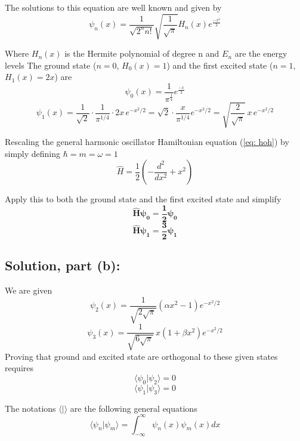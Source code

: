 \documentclass[12pt]{article}
\begin{document}
        The solutions to this equation are well known and given by
        \[
            \psi_n(x) = \frac{1}{\sqrt{2^n n!}} \sqrt{\frac{1}{\sqrt{\pi}}} H_n(x) e^{\frac{-x^2}{2}} 
        \]

        Where $H_n(x)$ is the Hermite polynomial of degree n and $E_n$ are the energy levels
        The ground state ($n=0$, $H_0(x)=1$) and the first excited state ($n=1$, $H_1(x)=2x$) are
        \[
            \psi_0(x) = \frac{1}{\pi^{\frac{1}{4}}} e^{\frac{-x}{2}}
        \]
        \[
            \psi_1(x) = \frac{1}{\sqrt{2}} \cdot \frac{1}{\pi^{1/4}} \cdot 2x \, e^{-x^2/2} = \sqrt{2} \cdot \frac{x}{\pi^{1/4}} e^{-x^2/2} = \sqrt{\frac{2}{\sqrt{\pi}}} \, x \, e^{-x^2/2}
        \]

        Rescaling the general harmonic oscillator Hamiltonian equation (\ref{eq: hoh}) by simply defining $\hbar = m = \omega = 1$
        \[
            \hat{H} = \frac{1}{2} \left( - \frac{d^2}{dx^2} + x^2 \right)
        \]

        Apply this to both the ground state and the first excited state and simplify
        \[
            \boldsymbol{\boxed{\hat{H} \psi_0 = \frac{1}{2} \psi_0}}
        \]
        \[
            \boldsymbol{\boxed{\hat{H} \psi_1 = \frac{3}{2} \psi_1}}
        \]

    \subsection{Solution, part (b):}        
        We are given 
        \[
            \psi_2(x) = \frac{1}{\sqrt{2 \sqrt{\pi}}} \left( \alpha x^2 - 1 \right) e^{-x^2/2}
        \]
        \[
            \psi_3(x) = \frac{1}{\sqrt{6 \sqrt{\pi}}} \, x \left( 1 + \beta x^2 \right) e^{-x^2/2}
        \]
        Proving that ground and excited state are orthogonal to these given states requires
        \begin{equation} \label{eq: psi0}
            \langle \psi_0 | \psi_2 \rangle = 0
        \end{equation}
        \begin{equation} \label{eq: psi1}
            \langle \psi_1|\psi_3 \rangle = 0
        \end{equation}

        The notations $\langle|\rangle$ are the following general equations
        \[
            \langle \psi_n | \psi_m \rangle = \int_{-\infty}^{\infty} \psi_n(x) \psi_m(x) dx
        \]
\end{document}
